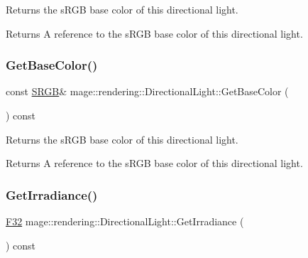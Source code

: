 Returns the s\+R\+GB base color of this directional light.

\begin{DoxyReturn}{Returns}
A reference to the s\+R\+GB base color of this directional light. 
\end{DoxyReturn}
\hypertarget{classmage_1_1rendering_1_1_directional_light_a37f94364981c5300dc127e8e55a471d8}{}\label{classmage_1_1rendering_1_1_directional_light_a37f94364981c5300dc127e8e55a471d8} 
\subsubsection{\texorpdfstring{Get\+Base\+Color()}{GetBaseColor()}\hspace{0.1cm}{\footnotesize\ttfamily [2/2]}}
{\footnotesize\ttfamily const \hyperlink{structmage_1_1_s_r_g_b}{S\+R\+GB}\& mage\+::rendering\+::\+Directional\+Light\+::\+Get\+Base\+Color (\begin{DoxyParamCaption}{ }\end{DoxyParamCaption}) const\hspace{0.3cm}{\ttfamily [noexcept]}}

Returns the s\+R\+GB base color of this directional light.

\begin{DoxyReturn}{Returns}
A reference to the s\+R\+GB base color of this directional light. 
\end{DoxyReturn}
\hypertarget{classmage_1_1rendering_1_1_directional_light_a1cba2b0099366af146c3ccf364946bf8}{}\label{classmage_1_1rendering_1_1_directional_light_a1cba2b0099366af146c3ccf364946bf8} 
\subsubsection{\texorpdfstring{Get\+Irradiance()}{GetIrradiance()}}
{\footnotesize\ttfamily \hyperlink{namespacemage_aa97e833b45f06d60a0a9c4fc22ae02c0}{F32} mage\+::rendering\+::\+Directional\+Light\+::\+Get\+Irradiance (\begin{DoxyParamCaption}{ }\end{DoxyParamCaption}) const\hspace{0.3cm}{\ttfamily [noexcept]}}

